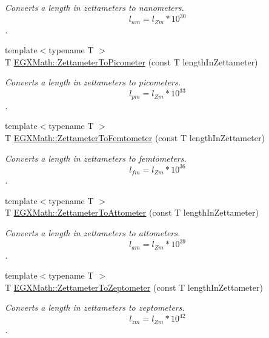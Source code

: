 \begin{DoxyCompactItemize}
\begin{DoxyCompactList}\small\item\em Converts a length in zettameters to nanometers. \[ l_{nm}=l_{Zm} * 10^{30} \]. \end{DoxyCompactList}\item 
{\footnotesize template$<$typename T $>$ }\\T \mbox{\hyperlink{group___e_g_x_math-_conversions-_length_conversions-_s_i-_zettameter-_s_i_gae7835234c6727bbfd1e9ad40c54a4740}{E\+G\+X\+Math\+::\+Zettameter\+To\+Picometer}} (const T length\+In\+Zettameter)
\begin{DoxyCompactList}\small\item\em Converts a length in zettameters to picometers. \[ l_{pm}=l_{Zm} * 10^{33} \]. \end{DoxyCompactList}\item 
{\footnotesize template$<$typename T $>$ }\\T \mbox{\hyperlink{group___e_g_x_math-_conversions-_length_conversions-_s_i-_zettameter-_s_i_ga9af7bed274fea1c279796cd6113e79c4}{E\+G\+X\+Math\+::\+Zettameter\+To\+Femtometer}} (const T length\+In\+Zettameter)
\begin{DoxyCompactList}\small\item\em Converts a length in zettameters to femtometers. \[ l_{fm}=l_{Zm} * 10^{36} \]. \end{DoxyCompactList}\item 
{\footnotesize template$<$typename T $>$ }\\T \mbox{\hyperlink{group___e_g_x_math-_conversions-_length_conversions-_s_i-_zettameter-_s_i_ga94b183c6ea2cd7e9df0edb3c9fd59a4a}{E\+G\+X\+Math\+::\+Zettameter\+To\+Attometer}} (const T length\+In\+Zettameter)
\begin{DoxyCompactList}\small\item\em Converts a length in zettameters to attometers. \[ l_{am}=l_{Zm} * 10^{39} \]. \end{DoxyCompactList}\item 
{\footnotesize template$<$typename T $>$ }\\T \mbox{\hyperlink{group___e_g_x_math-_conversions-_length_conversions-_s_i-_zettameter-_s_i_gab9f9d7e92a7aaf47b4b822163cd700c7}{E\+G\+X\+Math\+::\+Zettameter\+To\+Zeptometer}} (const T length\+In\+Zettameter)
\begin{DoxyCompactList}\small\item\em Converts a length in zettameters to zeptometers. \[ l_{zm}=l_{Zm} * 10^{42} \]. \end{DoxyCompactList}\item 

\end{DoxyCompactItemize}

